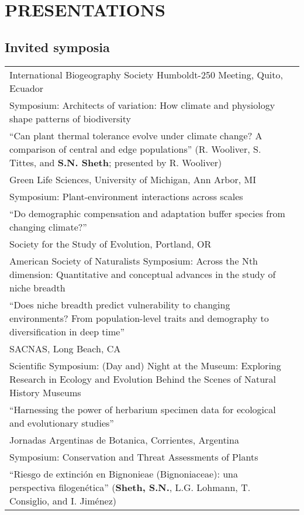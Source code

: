 \documentclass[11pt,english]{article}\usepackage[]{graphicx}\usepackage[]{color}
\providecommand{\tabularnewline}{\\}
\begin{document}
\section*{PRESENTATIONS}
\vspace{-0.5ex}
\subsection*{Invited symposia}

\begin{tabularx}{\textwidth}{@{}>{\raggedright}p{5.25in}
>{\raggedleft}X@{}}
International Biogeography Society Humboldt-250 Meeting, Quito, Ecuador & 2019 \tabularnewline
\addtolength{\leftskip}{5ex} Symposium: Architects of variation: How climate and physiology shape patterns of biodiversity  \tabularnewline
\addtolength{\leftskip}{5ex} ``Can plant thermal tolerance evolve under climate change? A comparison of central and edge populations'' (R. Wooliver, S. Tittes, and \textbf{S.N. Sheth}; presented by R. Wooliver)
\tabularnewline

Green Life Sciences, University of Michigan, Ann Arbor, MI & 2018 \tabularnewline
\addtolength{\leftskip}{5ex} Symposium: Plant-environment interactions across scales  \tabularnewline
\addtolength{\leftskip}{5ex} ``Do demographic compensation and adaptation buffer species from changing climate?'' \tabularnewline

Society for the Study of Evolution, Portland, OR & 2017 \tabularnewline
\addtolength{\leftskip}{5ex} American Society of Naturalists Symposium: Across the Nth dimension: Quantitative and conceptual advances in the study of niche breadth  \tabularnewline
\addtolength{\leftskip}{5ex} ``Does niche breadth predict vulnerability to changing environments? From population-level traits and demography to diversification in deep time'' \tabularnewline

SACNAS, Long Beach, CA & 2016 \tabularnewline
\addtolength{\leftskip}{5ex} Scientific Symposium: (Day and) Night at the Museum: Exploring Research in Ecology and Evolution Behind the Scenes of Natural History Museums \tabularnewline
\addtolength{\leftskip}{5ex} ``Harnessing the power of herbarium specimen data for ecological and evolutionary studies'' \tabularnewline

Jornadas Argentinas de Botanica, Corrientes, Argentina & 2007 \tabularnewline
\addtolength{\leftskip}{5ex} Symposium: Conservation and Threat Assessments of Plants \tabularnewline
\addtolength{\leftskip}{5ex} ``Riesgo de extinci\'on en Bignonieae (Bignoniaceae): una perspectiva filogen\'etica'' (\textbf{Sheth, S.N.}, L.G. Lohmann, T. Consiglio, and I. Jim\'enez) \tabularnewline

\end{tabularx}
\end{document}
